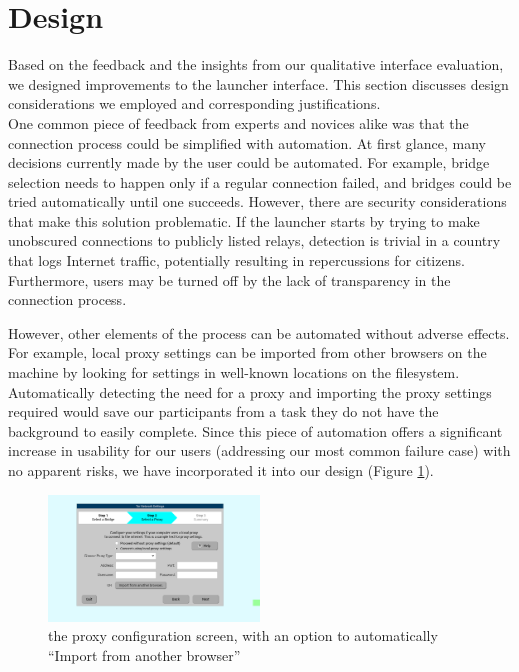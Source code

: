 \documentclass{template}
\begin{document}
\section{Design}
Based on the feedback and the insights from our qualitative interface evaluation,
 we designed improvements to the launcher interface. This section
discusses design considerations we employed and corresponding justifications. \\

One common piece of feedback from experts and novices alike was that the
connection process could be simplified with automation. At first glance, many
decisions currently made by the user could be automated. For example, bridge
selection needs to happen only if a regular connection failed, and bridges could
be tried automatically until one succeeds. However, there are security
considerations that make this solution problematic. If the launcher starts by
trying to make unobscured connections to publicly listed relays, detection is
trivial in a country that logs Internet traffic, potentially resulting in
repercussions for citizens. Furthermore, users may be turned off by the
lack of transparency in the connection process.

However, other elements of the process can be automated without adverse effects.
For example, local proxy settings can be imported from other browsers on the
machine by looking for settings in well-known locations on the filesystem. Automatically
detecting the need for a proxy and importing the proxy settings required would save
our participants from a task they do not have the background to easily complete. 
Since this piece of automation offers a significant increase in usability for our users
(addressing our most common failure case) with no apparent risks, we have incorporated it
into our design (Figure \ref{fig:redesign-proxy}). \\

\begin{figure}[t]
\label{fig:redesign-proxy}
  \centering
    \includegraphics[width=0.5\textwidth]{redesign-proxy.png}
    \caption{the proxy configuration screen, with an option to automatically
        ``Import from another browser''}
\end{figure}
\end{document}

